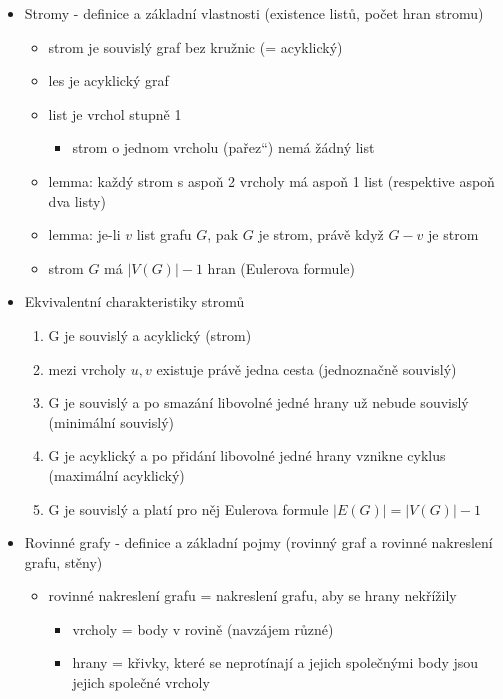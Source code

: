 \begin{itemize}
\begin{itemize}
\begin{itemize}
\end{itemize}
\item věta: graf $G$ je eulerovský $\iff G$ je souvislý a každý jeho vrchol má sudý stupeň
\end{itemize}
\item Stromy - definice a základní vlastnosti (existence listů, počet hran stromu)
\begin{itemize}
\item strom je souvislý graf bez kružnic (= acyklický)
\item les je acyklický graf
\item list je vrchol stupně 1
\begin{itemize}
\item strom o jednom vrcholu (\quotedblbase{}pařez\textquotedblleft{}) nemá žádný list
\end{itemize}
\item lemma: každý strom s aspoň 2 vrcholy má aspoň 1 list (respektive aspoň dva listy)
\item lemma: je-li $v$ list grafu $G$, pak $G$ je strom, právě když $G-v$ je strom
\item strom $G$ má $|V(G)|-1$ hran (Eulerova formule)
\end{itemize}
\item Ekvivalentní charakteristiky stromů
\begin{enumerate}
\item G je souvislý a acyklický (strom)
\item mezi vrcholy $u, v$ existuje právě jedna cesta (jednoznačně souvislý)
\item G je souvislý a po smazání libovolné jedné hrany už nebude souvislý (minimální souvislý)
\item G je acyklický a po přidání libovolné jedné hrany vznikne cyklus (maximální acyklický)
\item G je souvislý a platí pro něj Eulerova formule $|E(G)|=|V(G)|-1$
\end{enumerate}
\item Rovinné grafy - definice a základní pojmy (rovinný graf a rovinné nakreslení grafu, stěny)
\begin{itemize}
\item rovinné nakreslení grafu = nakreslení grafu, aby se hrany nekřížily
\begin{itemize}
\item vrcholy = body v rovině (navzájem různé)
\item hrany = křivky, které se neprotínají a jejich společnými body jsou jejich společné vrcholy

\end{itemize}
\end{itemize}
\end{itemize}
